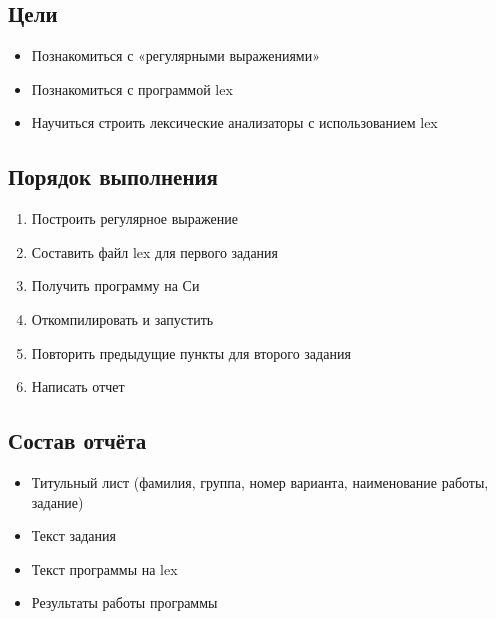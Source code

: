 \documentclass[a4paper,12pt]{article}
\begin{document}
\subsection{Цели}
\begin{itemize}
	\item Познакомиться с «регулярными выражениями»
	\item Познакомиться с программой lex
	\item Научиться строить лексические анализаторы с использованием lex
\end{itemize}

\subsection{Порядок выполнения}
\begin{enumerate}
	\item Построить регулярное выражение
	\item Составить файл lex для первого задания
	\item Получить программу на Си
	\item Откомпилировать и запустить
	\item Повторить предыдущие пункты для второго задания
	\item Написать отчет
\end{enumerate}

\subsection{Состав отчёта}
\begin{itemize}
	\item Титульный лист (фамилия, группа, номер варианта, наименование работы, задание)
	\item Текст задания
	\item Текст программы на lex
	\item Результаты работы программы
\end{itemize}
\end{document}

